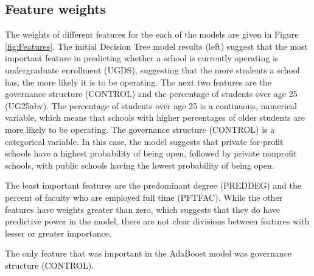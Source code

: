 \documentclass[11pt, letterpaper]{article}
\begin{document}
\subsection{Feature weights}
The weights of different features for the each of the models are given in Figure \ref{fig:Features}. The initial Decision Tree model results (left) suggest that the most important feature in predicting whether a school is currently operating is undergraduate enrollment (UGDS), suggesting that the more students a school has, the more likely it is to be operating. The next two features are the governance structure (CONTROL) and the percentage of students over age 25 (UG25abv). The percentage of students over age 25 is a continuous, numerical variable, which means that schools with higher percentages of older students are more likely to be operating. The governance structure (CONTROL) is a categorical variable. In this case, the model suggests that private for-profit schools have a highest probability of being open, followed by private nonprofit schools, with public schools having the lowest probability of being open.

The least important features are the predominant degree (PREDDEG) and the percent of faculty who are employed full time (PFTFAC). While the other features have weights greater than zero, which suggests that they do have predictive power in the model, there are not clear divisions between features with lesser or greater importance.


The only feature that was important in the AdaBoost model was governance structure (CONTROL).
\end{document}
